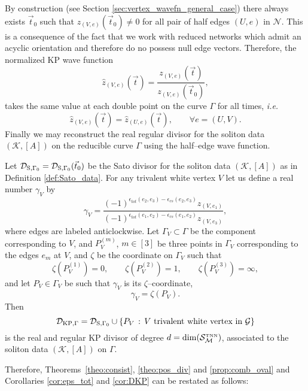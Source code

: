 \documentclass[11pt]{amsart}
\theoremstyle{plain}
\numberwithin{equation}{section}
\def \DKP {{\mathcal D}_{\textup{\scriptsize KP},\Gamma}}
\def \DS {{\mathcal D}_{\textup{\scriptsize S},\Gamma_0}}
\def \S {{\mathcal S}_{\mathcal M}^{\mbox{\tiny TNN}}}
\begin{document}
By construction (see Section \ref{sec:vertex_wavefn_general_case}) there always exists $\vec t_0$ such that $z_{(V,e)}(\vec t_0) \not =0$ for all pair of half edges $(U,e)$ in $\mathcal N$. This is a consequence of the fact that we work with reduced networks which admit an acyclic orientation and therefore do no possess null edge vectors. Therefore, the normalized KP wave function  
\[
\hat z_{(V,e)}(\vec t) = \frac{z_{(V,e)}(\vec t)}{z_{(V,e)}(\vec t_0)},
\] 
takes the same value at each double point on the curve $\Gamma$ for all times, {\sl i.e. }
\[
\hat z_{(V,e)}(\vec t) = \hat z_{(U,e)}(\vec t), \quad\quad \forall e=(U,V).
\]
Finally we may reconstruct the real regular divisor for the soliton data $(\mathcal K, [A])$ on the reducible curve $\Gamma$ using the half--edge wave function.

Let $\DS = \DS (\vec t_0)$ be the Sato divisor for the soliton data $(\mathcal K, [A])$ as in Definition \ref{def:Sato_data}. For any trivalent white vertex $V$ let us define a real number $\gamma_V$ by
\[
\gamma_V = \frac{(-1)^{\epsilon_{tot} (e_2,e_3)-\epsilon_{cs} (e_2,e_3)} z_{(V,e_1)}}{(-1)^{\epsilon_{tot} (e_1,e_2)-\epsilon_{cs} (e_1,e_2)  } z_{(V,e_3)}},
\]
where edges are labeled anticlockwise. Let $\Gamma_V\subset \Gamma$ be the component corresponding to $V$, and $P_V^{(m)}$, $m\in[3]$ be three points in $\Gamma_V$ corresponding to the edges $e_m$ at $V$, and $\zeta$ be the coordinate on $\Gamma_V$ such that
\[
\zeta(P_V^{(1)}) =0, \quad\quad \zeta(P_V^{(2)}) =1, \quad\quad 
\zeta(P_V^{(3)}) =\infty,
\]
and let $P_V \in \Gamma_V$ be such that $\gamma_V$ is its $\zeta$--coordinate,
\[
\gamma_V = \zeta (P_V).
\]
Then 
\[
\DKP = \DS \cup \{ P_V \, : \, V \mbox{ trivalent white vertex in } \mathcal G \}
\]
is the real and regular KP divisor of degree $d=\dim (\S)$, associated to the soliton data $(\mathcal K, [A])$ on $\Gamma$.

Therefore, Theorems~\ref{theo:consist}, \ref{theo:pos_div} and \ref{prop:comb_oval} and Corollaries \ref{cor:eps_tot} and \ref{cor:DKP} can be restated as follows:
\end{document}
